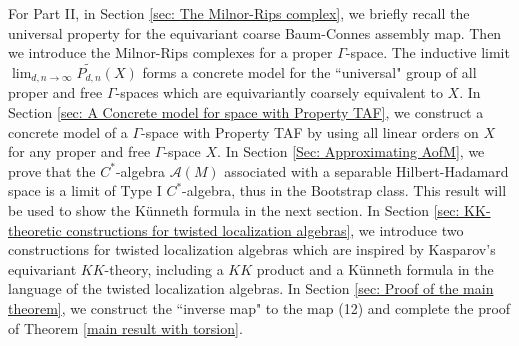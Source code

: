 \documentclass[11pt]{article}
\theoremstyle{definition}
\theoremstyle{plain}
\def\A{\mathcal A}\def\C{\mathcal C}\def\B{\mathcal B}\def\E{\mathcal E}\def\O{\mathcal O}\def\h{\mathfrak h}\def\K{\mathcal K}\def\F{\mathcal F}\def\P{\mathcal P}\def\L{\mathcal L}\def\R{\mathcal R}\def\Q{\mathcal Q}\def\H{\mathcal H}\def\S{\mathcal S}\def\N{\mathcal N}\def\U{\mathcal U}\def\V{\mathcal V}
\def\MRdnX{\widetilde{P_{d,n}}(X)}
\def\Ga{\Gamma}
\begin{document}
For Part II, in Section \ref{sec: The Milnor-Rips complex}, we briefly recall the universal property for the equivariant coarse Baum-Connes assembly map. Then we introduce the Milnor-Rips complexes for a proper $\Ga$-space. The inductive limit $\lim_{d,n\to\infty}\MRdnX$ forms a concrete model for the ``universal" group of all proper and free $\Ga$-spaces which are equivariantly coarsely equivalent to $X$. In Section \ref{sec: A Concrete model for space with Property TAF}, we construct a concrete model of a $\Ga$-space with Property TAF by using all linear orders on $X$ for any proper and free $\Ga$-space $X$. In Section \ref{Sec: Approximating AofM}, we prove that the $C^*$-algebra $\A(M)$ associated with a separable Hilbert-Hadamard space is a limit of Type I $C^*$-algebra, thus in the Bootstrap class. This result will be used to show the K\"unneth formula in the next section. In Section \ref{sec: KK-theoretic constructions for twisted localization algebras}, we introduce two constructions for twisted localization algebras which are inspired by Kasparov's equivariant $KK$-theory, including a $KK$ product and a K\"unneth formula in the language of the twisted localization algebras. In Section \ref{sec: Proof of the main theorem}, we construct the ``inverse map" to the map (12) and complete the proof of Theorem \ref{main result with torsion}.
\end{document}

